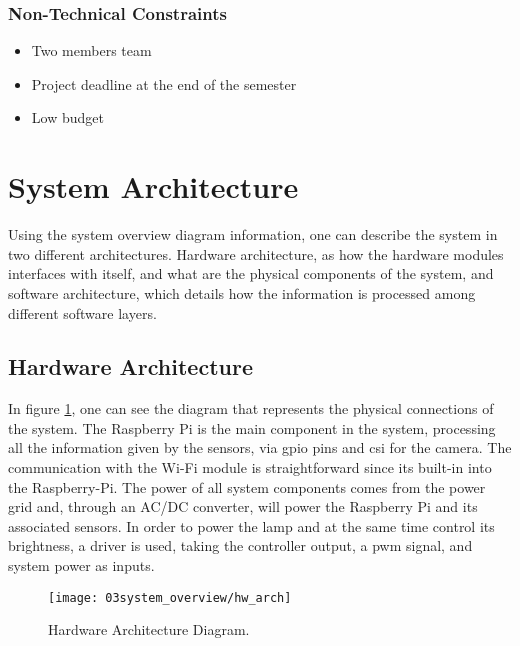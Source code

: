 \subsubsection{Non-Technical Constraints}
\begin{itemize}
        \item Two members team
        \item Project deadline at the end of the semester
        \item Low budget
\end{itemize}

\section{System Architecture}
Using the system overview diagram information, one can describe the system in two different architectures. Hardware architecture, as how the hardware modules interfaces with itself, and what are the physical components of the system, and software architecture, which details how the information is processed among different software layers.

\subsection{Hardware Architecture}
In figure \ref{fig:hw_arch}, one can see the diagram that represents the physical connections of the system. The Raspberry Pi is the main component in the system, processing all the information given by the sensors, via \ac{gpio} pins and \ac{csi} for the camera. The communication with the Wi-Fi module is straightforward since its built-in into the Raspberry-Pi.
The power of all system components comes from the power grid and, through an AC/DC converter, will power the Raspberry Pi and its associated sensors.
In order to power the lamp and at the same time control its brightness, a driver is used, taking the controller output, a \ac{pwm} signal, and system power as inputs. 

\clearpage 
\begin{figure}[ht]
	\centering
	\texttt{[image: 03system\_overview/hw\_arch]}
	\caption{Hardware Architecture Diagram.}
	\label{fig:hw_arch}
\end{figure}


